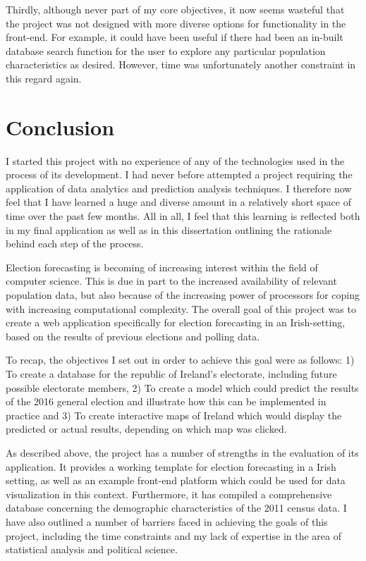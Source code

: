 Thirdly, although never part of my core objectives, it now seems wasteful that the project was not designed with more diverse options for functionality in the front-end. For example, it could have been useful if there had been an in-built database search function for the user to explore any particular population characteristics as desired. However, time was unfortunately another constraint in this regard again. 
\chapter{Conclusion}
I started this project with no experience of any of the technologies used in the process of its development. I had never before attempted a project requiring the application of data analytics and prediction analysis techniques. I therefore now feel that I have learned a huge and diverse amount in a relatively short space of time over the past few months. All in all, I feel that this learning is reflected both in my final application as well as in this dissertation outlining the rationale behind each step of the process.  

Election forecasting is becoming of increasing interest within the field of computer science. This is due in part to the increased availability of relevant population data, but also because of the increasing power of processors for coping with increasing computational complexity. The overall goal of this project was to create a web application specifically for election forecasting in an Irish-setting, based on the results of previous elections and polling data. 

To recap, the objectives I set out in order to achieve this goal were as follows: 1) To create a database for the republic of Ireland's electorate, including future possible electorate members, 2) To create a model which could predict the results of the 2016 general election and illustrate how this can be implemented in practice and 3) To create interactive maps of Ireland which would display the predicted or actual results, depending on which map was clicked. 

As described above, the project has a number of strengths in the evaluation of its application. It provides a working template for election forecasting in a Irish setting, as well as an example front-end platform which could be used for data visualization in this context. Furthermore, it has compiled a comprehensive database concerning the demographic characteristics of the 2011 census data. 
I have also outlined a number of barriers faced in achieving the goals of this project, including the time constraints and my lack of expertise in the area of statistical analysis and political science.
 
